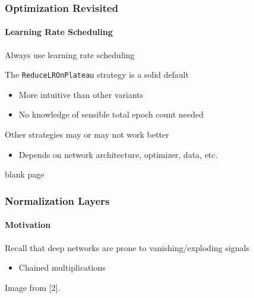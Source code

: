 \documentclass[xetex,professionalfont]{beamer}
\begin{document}
\begin{frame}
  \frametitle{Optimization Revisited}
  \framesubtitle{Learning Rate Scheduling}
  
  Always use learning rate scheduling

  \bigskip

  The \texttt{ReduceLROnPlateau} strategy is a solid default
  \begin{itemize}
    \item More intuitive than other variants
    \item No knowledge of sensible total epoch count needed
  \end{itemize}

  \bigskip

  Other strategies may or may not work better
  \begin{itemize}
    \item Depends on network architecture, optimizer, data, etc.
  \end{itemize}


\end{frame}


{
\begin{frame}


\begin{center}
\textcolor[rgb]{0.9,0.9,0.9}{blank page}
\end{center}

\end{frame}
}


\begin{frame}
  \frametitle{Normalization Layers}
  \framesubtitle{Motivation}

  Recall that deep networks are prone to vanishing/exploding signals
  \begin{itemize}
    \item Chained multiplications
\end{itemize}

  \bigskip

  \begin{center}
    {\centering Image from [2].}
  \end{center}

  \end{frame}
\end{document}
